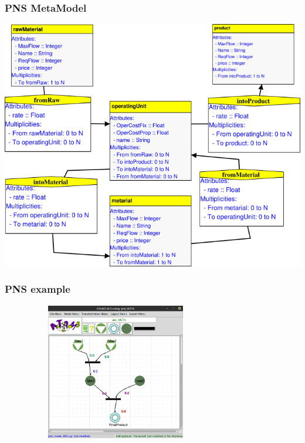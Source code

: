 \documentclass[12pt]{beamer}
\begin{document}
\begin{frame}
\frametitle{PNS MetaModel} 
	 \begin{center}	
	\includegraphics[scale=0.45]{pns_meta}
	\end{center}
\end{frame}
 
\begin{frame}
\frametitle{PNS example} 
	 \begin{center}	
	\includegraphics[width=10cm,height=6cm]{pns_ex}
	\end{center}
\end{frame}
\end{document}
